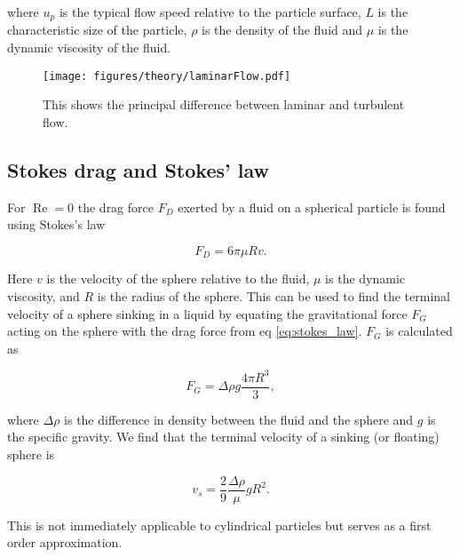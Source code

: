 where $u_p$ is the typical flow speed relative to the particle surface, $L$ is the characteristic size of the particle, $\rho$ is the density of the fluid and $\mu$ is the dynamic viscosity of the fluid. 

\begin{figure}[H]
\centering
\texttt{[image: figures/theory/laminarFlow.pdf]}
\caption{This shows the principal difference between laminar and turbulent flow.}
\label{fig:laminar_flow}
\end{figure}

\subsection{Stokes drag and Stokes' law}
For $\operatorname{Re} = 0$ the drag force $F_D$ exerted by a fluid on a spherical particle is found using Stokes's law \cite{introfluid2}

\begin{equation}\label{eq:stokes_law}
F_D = 6\pi \mu R v.
\end{equation}

\noindent Here $v$ is the velocity of the sphere relative to the fluid, $\mu$ is the dynamic viscosity, and $R$ is the radius of the sphere. This can be used to find the terminal velocity of a sphere sinking in a liquid by equating the gravitational force $F_G$ acting on the sphere with the drag force from eq \ref{eq:stokes_law}. $F_G$ is calculated as

\begin{equation}
F_G = \Delta \rho g \frac{4\pi R^3}{3},
\end{equation}

\noindent where $\Delta \rho$ is the difference in density between the fluid and the sphere and $g$ is the specific gravity. We find that the terminal velocity of a sinking (or floating) sphere is

\begin{equation}\label{eq:fallingSphere}
v_s = \frac{2}{9} \frac{\Delta \rho}{\mu} g R^2.
\end{equation}

\noindent This is not immediately applicable to cylindrical particles but serves as a first order approximation.